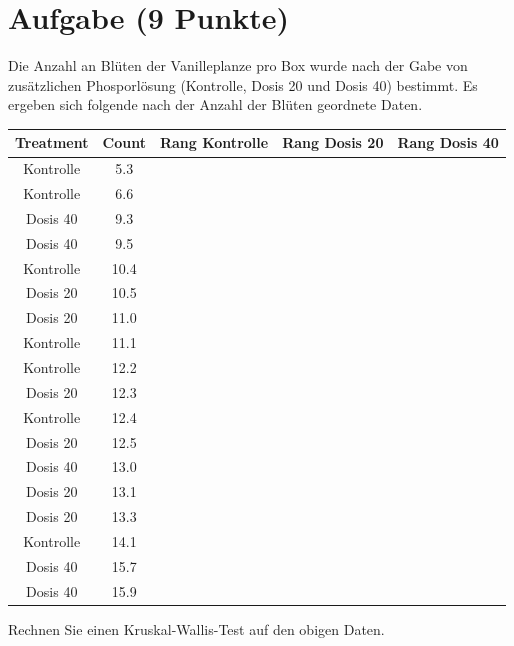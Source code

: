 \documentclass[a4paper, 10pt]{scrartcl}\usepackage[]{graphicx}\usepackage[]{xcolor}
\newenvironment{knitrout}{}{} %
\begin{document}
\section{Aufgabe \hfill (9 Punkte)}



Die Anzahl an Bl{\"u}ten der Vanilleplanze pro Box wurde nach der Gabe von
zus{\"a}tzlichen Phosporl{\"o}sung (Kontrolle, Dosis 20 und Dosis 40) bestimmt. Es
ergeben sich folgende nach der Anzahl der Bl{\"u}ten geordnete Daten.

\begin{knitrout}
\color{fgcolor}\begin{table}[!h]
\centering
\begin{tabular}{ccccc}
\toprule
Treatment & Count & Rang Kontrolle & Rang Dosis 20 & Rang Dosis 40\\
\midrule
Kontrolle & 5.3 &  &  & \\
Kontrolle & 6.6 &  &  & \\
Dosis 40 & 9.3 &  &  & \\
Dosis 40 & 9.5 &  &  & \\
Kontrolle & 10.4 &  &  & \\
\addlinespace
Dosis 20 & 10.5 &  &  & \\
Dosis 20 & 11.0 &  &  & \\
Kontrolle & 11.1 &  &  & \\
Kontrolle & 12.2 &  &  & \\
Dosis 20 & 12.3 &  &  & \\
\addlinespace
Kontrolle & 12.4 &  &  & \\
Dosis 20 & 12.5 &  &  & \\
Dosis 40 & 13.0 &  &  & \\
Dosis 20 & 13.1 &  &  & \\
Dosis 20 & 13.3 &  &  & \\
\addlinespace
Kontrolle & 14.1 &  &  & \\
Dosis 40 & 15.7 &  &  & \\
Dosis 40 & 15.9 &  &  & \\
\bottomrule
\end{tabular}
\end{table}

\end{knitrout}

Rechnen Sie einen Kruskal-Wallis-Test auf den obigen Daten.
\end{document}
